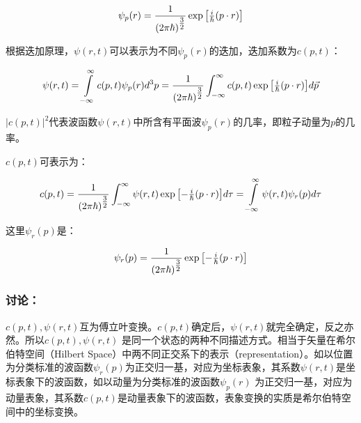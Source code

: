 \begin{center}
\begin{equation}
\psi _p (r) = \frac{1}{{\left( {2\pi \hbar } \right)^{{\textstyle{3
\over 2}}} }}\exp \left[ {{\textstyle{i \over \hbar }}(p \cdot r)}
\right]
\end{equation}
\end{center}

根据迭加原理，$\psi(r,t)$可以表示为不同$\psi_p(r)$的迭加，迭加系数为$c(p,t)$：

\begin{equation}
\psi (r,t) = \int\limits_{ - \infty }^\infty  {c(p,t)\psi _p (r)d^3
p}  = \frac{1}{{\left( {2\pi \hbar } \right)^{{\textstyle{3 \over
2}}} }}\int_{ - \infty }^\infty  {c(p,t)\exp \left[ {{\textstyle{i
\over \hbar }}(p \cdot r)} \right]} d\vec p
\end{equation}

$\left| {c(p,t)} \right|^2 $代表波函数$\psi (r,t)$中所含有平面波$\psi _p (r)$的几率，即粒子动量为$p$的几率。

$c(p,t)$可表示为：

\begin{center}
\begin{equation}
   c(p,t) = \frac{1}{{\left( {2\pi \hbar } \right)^{{\textstyle{3 \over 2}}} }}\int_{ - \infty }^\infty  {\psi (r,t)\exp \left[ { - {\textstyle{i \over \hbar }}(p \cdot r)} \right]} d\tau  = \int\limits_{ - \infty }^\infty  {\psi (r,t)\psi _r (p)d\tau }
\end{equation}
\end{center}

这里$\psi _r (p)$是：

\begin{center}
\begin{equation}
    \psi _r (p) = \frac{1}{{\left( {2\pi \hbar } \right)^{{\textstyle{3 \over 2}}} }}\exp \left[ { - {\textstyle{i \over \hbar }}(p \cdot r)} \right]
\end{equation}
\end{center}

\subsubsection*{讨论：}

$c(p,t),\psi (r,t)$互为傅立叶变换。$c(p,t)$确定后，$\psi (r,t)$就完全确定，反之亦然。所以$c(p,t),\psi (r,t)$
是同一个状态的两种不同描述方式。相当于矢量在希尔伯特空间（Hilbert Space）中两不同正交系下的表示（representation）。如以位置为分类标准的波函数$\psi _r (p)$为正交归一基，对应为坐标表象，其系数$\psi (r,t)$是坐标表象下的波函数，如以动量为分类标准的波函数$\psi _p (r)$
为正交归一基，对应为动量表象，其系数$c(p,t)$是动量表象下的波函数，表象变换的实质是希尔伯特空间中的坐标变换。

